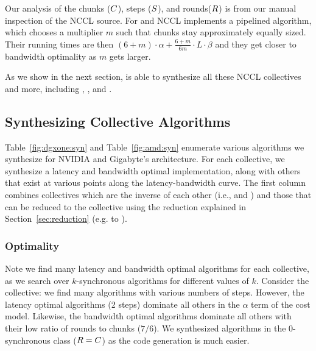 Our analysis of the chunks ($C$), steps ($S$), and rounds($R$) is from our manual
inspection of the NCCL source. For \reduce and \broadcast NCCL implements a
pipelined algorithm, which chooses a multiplier $m$ such that chunks stay
approximately equally sized. Their running times are then $(6+m) \cdot \alpha + \frac{6+m}{6m}\cdot L \cdot \beta$
and they get closer to bandwidth optimality as $m$ gets larger.

As we show in the next section, \tool{} is able to synthesize all
these NCCL collectives and more, including \scatter, \gathercoll, and
\alltoall.


\subsection{Synthesizing Collective Algorithms}
Table~\ref{fig:dgxone:syn} and Table~\ref{fig:amd:syn} enumerate
various algorithms we synthesize for NVIDIA \dgxone and Gigabyte's
\amd architecture.  For each collective, we synthesize a latency and
bandwidth optimal implementation, along with others that exist at
various points along the latency-bandwidth curve. The first column
combines collectives which are the inverse of each other (i.e.,
\scatter and \gathercoll) and those that can be reduced to the
\broadcasting collective using the reduction explained in
Section~\ref{sec:reduction} (e.g. \reduce to \broadcast).

\subsubsection{Optimality}
Note we find many latency and bandwidth optimal algorithms
for each collective, as we search over $k$-synchronous algorithms for different values of $k$.
Consider the \allgather collective: we find many algorithms with various numbers
of steps. However, the latency optimal algorithms (2 steps) dominate all others
in the $\alpha$ term of the cost model.  Likewise, the bandwidth optimal
algorithms dominate all others with their low ratio of rounds to chunks ($7/6$).
We synthesized algorithms in the $0$-synchronous class ($R = C$) as
the code generation is much easier.


